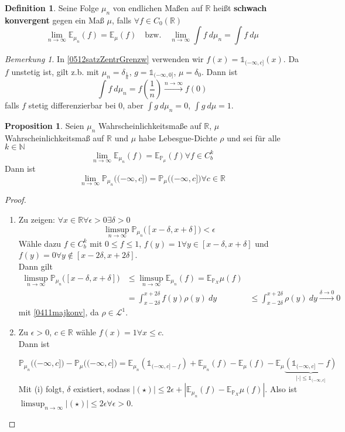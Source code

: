 \documentclass[10pt,a4paper]{article}
\newcommand{\N}{\ensuremath{\mathbb{N}}}
\newcommand{\R}{\ensuremath{\mathbb{R}}}
\newcommand{\abs}[1]{\left|#1\right|}
\newcommand{\cha}{\mathds{1}}
\newcommand{\Prb}{\mathbb P}
\newcommand{\Epv}{\ensuremath{\mathbb{E}}}
\newcommand{\scL}{\mathscr L}
\theoremstyle{plain}
\theoremstyle{definition}
\newtheorem{definition}[theorem]{Definition}
\newtheorem{prop}[theorem]{Proposition}
\theoremstyle{remark}
\newtheorem*{bem*}{Bemerkung}
\begin{document}
	\begin{definition}
		Seine Folge $\mu_n$ von endlichen Maßen auf $\R$ heißt \textbf{schwach konvergent} gegen ein Maß $\mu$, falls $\forall f\in C_0(\R)$
		\[\lim\limits_{n\to\infty}\Epv_{\mu_n}(f)=\Epv_{\mu}(f)\quad\text{bzw.}\quad\lim\limits_{n\to\infty}\int f~d\mu_n=\int f~d\mu\]
	\end{definition}
	
	\begin{bem*}
		In \ref{0512satzZentrGrenzw} verwenden wir $f(x)=\cha_{(-\infty,c]}(x)$. Da $f$ unstetig ist, gilt z.b. mit $\mu_n=\delta_{\frac{1}{n}}$, $g=\cha_{(-\infty,0]}$, $\mu=\delta_0$. Dann ist
		\[\int f~d\mu_n=f\left(\frac{1}{n}\right)\xrightarrow{n\to\infty}f(0)\]
		falls $f$ stetig differenzierbar bei $0$, aber $\int g~d\mu_n=0$, $\int g~d\mu=1$.
	\end{bem*}

	\begin{prop}\label{0515prop}
		Seien $\mu_n$ Wahrscheinlichkeitsmaße auf $\R$, $\mu$ Wahrscheinlichkeitsmaß auf $\R$ und $\mu$ habe Lebesgue-Dichte $\rho$ und sei für alle $k\in\N$
		\[\lim\limits_{n\to\infty}\Epv_{\mu_n}(f)=\Epv_{\Prb_\mu}(f)\forall f\in C_b^k\]
		Dann ist
		\[\lim\limits_{n\to\infty}\Prb_{\mu_n}\big((-\infty,c]\big)=\Prb_\mu\big((-\infty,c]\big)\forall c\in\R\]
	\end{prop}
	\begin{proof}
		\begin{enumerate}[label=(\roman*)]
			\item Zu zeigen: $\forall x\in\R\forall\epsilon>0\exists\delta>0$
			\[\limsup_{n\to\infty}\Prb_{\mu_n}\big([x-\delta,x+\delta]\big)<\epsilon\]
			Wähle dazu $f\in C_b^k$ mit $0\leq f\leq 1$, $f(y)=1\forall y\in[x-\delta,x+\delta]$ und $f(y)=0\forall y\notin[x-2\delta,x+2\delta]$.\\
			Dann gilt
			\begin{align*}
			\limsup_{n\to\infty} \Prb_{\mu_n}\big([x-\delta,x+\delta]\big)&\leq \limsup_{n\to\infty} \Epv_{\mu_n}(f)=\Epv_{\Prb_X}\mu(f)\\
			&=\int_{x-2\delta}^{x+2\delta}f(y)\rho(y)~dy&\leq \int_{x-2\delta}^{x+2\delta}\rho(y)~dy\xrightarrow{\delta\to 0}0
			\end{align*}
			mit \ref{0411majkonv}, da $\rho\in\scL^1$.
			\item Zu $\epsilon>0$, $c\in\R$ wähle $f(x)=1\forall x\leq c$.\\
			Dann ist
			
			\[\Prb_{\mu_n}\big((-\infty,c]\big)-\Prb_\mu\big((-\infty,c]\big)=\Epv_{\mu_n}\left(\cha_{(-\infty,c]-f}\right)\tag{\star}+\Epv_{\mu_n}(f)-\Epv_{\mu}(f)-\Epv_\mu\underbrace{\left(\cha_{(-\infty,c]}-f\right)}_{|\cdot|\leq\cha_{(-\infty,c]}}\]
			Mit (i) folgt, $\delta$ existiert, sodass $|(\star)|\leq 2\epsilon+\abs{\Epv_{\mu_n}(f)-\Epv_{\Prb_X}\mu(f)}$.
			Also ist $\limsup_{n\to\infty}\abs{(\star)}\leq 2\epsilon\forall\epsilon>0$.
		\end{enumerate}
	\end{proof}
\end{document}
